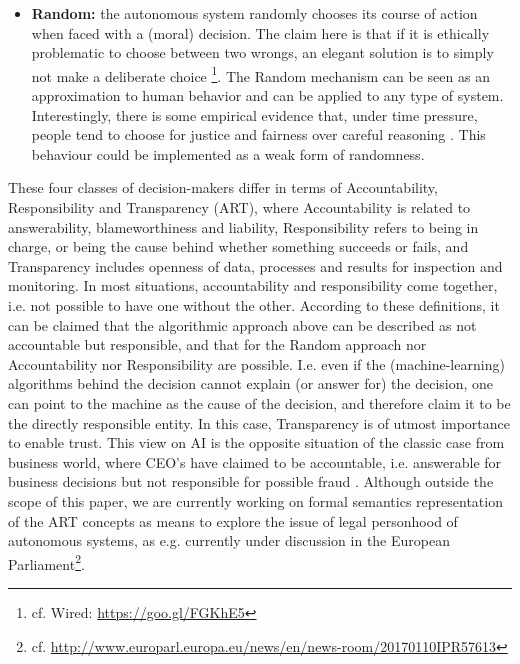 \documentclass[twocolumn]{article}
\begin{document}
\begin{itemize}
\item \textbf{Random:} the autonomous system randomly chooses its course of action when faced with a (moral) decision. The claim here is that if it is ethically problematic to choose between two wrongs, an elegant solution is to simply not make a deliberate choice \footnote{cf. Wired: \url{https://goo.gl/FGKhE5}}. The Random mechanism can be seen as an approximation to human behavior and can be applied to any type of system. Interestingly, there is some empirical evidence that, under time pressure, people tend to choose for justice and fairness over careful reasoning \cite{SJOP:SJOP367}. This behaviour could be implemented as a weak form of randomness. 
\end{itemize}

These four classes of decision-makers differ in terms of Accountability, Responsibility and Transparency (ART), where Accountability is related to answerability, blameworthiness and liability, Responsibility refers to being in charge, or being the cause behind whether something succeeds or fails, and Transparency includes openness of data, processes and results for inspection and monitoring. In most situations, accountability and responsibility come together, i.e. not possible to have one without the other. According to these definitions, it can be claimed that the algorithmic approach above can be described as not accountable but responsible, and that for the Random approach nor Accountability nor Responsibility are possible. I.e. even if the (machine-learning) algorithms behind the decision cannot explain (or answer for) the decision, one can point to the machine as the cause of the decision, and therefore claim it to be the directly responsible entity. In this case, Transparency is of utmost importance to enable trust. This view on AI is the opposite situation of the classic case from business world, where CEO's have claimed to be accountable, i.e. answerable for business decisions but not responsible for possible fraud \cite{Lay11}. Although outside the scope of this paper, we are currently working on  formal semantics representation of the ART concepts as means to explore the issue of legal personhood of autonomous systems, as e.g. currently under discussion in the European Parliament\footnote{cf. \url{http://www.europarl.europa.eu/news/en/news-room/20170110IPR57613}}.
\end{document}
